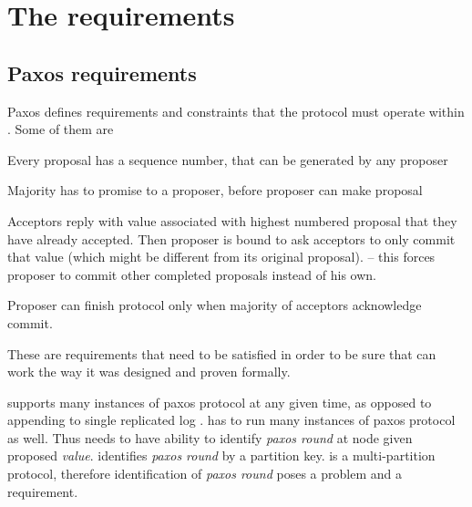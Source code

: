 
\section{The requirements}\label{sec:mpp:requirements}

\subsection{Paxos requirements}
Paxos defines requirements and constraints that the protocol must operate within \cite{lamport2001paxosMadeSimple}. Some of them are \begin{enumerate*}
  \item Every proposal has a sequence number, that can be generated by any proposer
  \item Majority has to promise to a proposer, before proposer can make proposal
  \item Acceptors reply with value associated with highest numbered proposal that they have already accepted. Then proposer is bound to ask acceptors to only commit that value (which might be different from its original proposal). -- this forces proposer to commit other completed proposals instead of his own.\label{sec:mpp:requirements:finishInProgress}
  \item Proposer can finish protocol only when majority of acceptors acknowledge commit.
\end{enumerate*}
These are requirements that need to be satisfied in order to be sure that \paxos can work the way it was designed and proven formally. 

\lwt supports many instances of paxos protocol at any given time, as opposed to appending to single replicated log \cite{chandra2007PaxosMadeLive}. \mpp has to run many instances of paxos protocol as well. Thus \mpp needs to have ability to identify \emph{paxos round} at node given proposed \emph{value}. \lwt identifies \emph{paxos round} by a partition key. \mpp is a multi-partition protocol, therefore identification of \emph{paxos round} poses a problem and a requirement. \label{sec:mpp:requirements:identifyRound}




